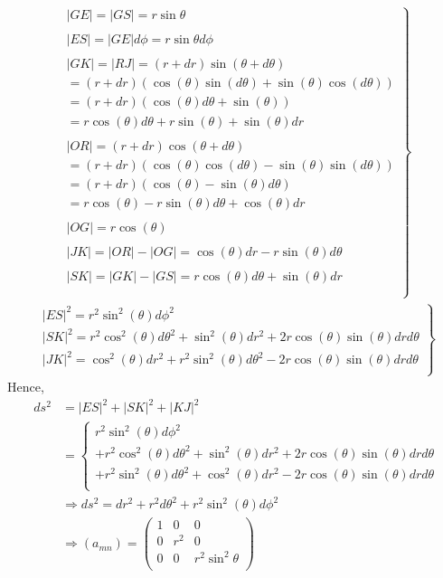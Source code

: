 \begin{align}
\left.
\begin{array}{c}
\ |GE| = |GS| = r\sin\theta\\\\
\ |ES| = |GE|d\phi = r\sin\theta d\phi\\\\
\ |GK| = |RJ| = (r+dr)\sin(\theta+d\theta) \\
\ =(r+dr)(\cos(\theta)\sin(d\theta)+\sin(\theta)\cos(d\theta) )\\
\ = (r+dr)(\cos(\theta)d\theta+\sin(\theta))\\
\ = r\cos(\theta)d\theta+r\sin(\theta)+\sin(\theta)dr\\\\
\ |OR| =  (r+dr)\cos(\theta+d\theta)\\
\ = (r+dr)(\cos(\theta)\cos(d\theta)-\sin(\theta)\sin(d\theta))\\
\ = (r+dr)(\cos(\theta)-\sin(\theta)d\theta)\\
\ = r\cos(\theta)-r\sin(\theta)d\theta + \cos(\theta)dr\\\\
\ |OG| = r\cos(\theta)\\\\
\ |JK| = |OR|-|OG| = \cos(\theta)dr-r\sin(\theta)d\theta\\\\
\ |SK| = |GK|-|GS| = r\cos(\theta)d\theta+\sin(\theta)dr\\\\
\end{array}
\right\}
\end{align}
\begin{align}
\left.
\begin{array}{c}
\ |ES|^2 = r^2\sin^2(\theta)d\phi^2\\
\ |SK|^2 = r^2\cos^2(\theta)d\theta^2+\sin^2(\theta)dr^2 +2r\cos(\theta)\sin(\theta)drd\theta \\
\ |JK|^2 = \cos^2(\theta)dr^2+r^2\sin^2(\theta)d\theta^2 -2r\cos(\theta)\sin(\theta)drd\theta\\
\end{array}
\right\}
\end{align}
Hence,
\begin{align}
\ ds^2 &= |ES|^2+|SK|^2+|KJ|^2\\
&= \left\{ \begin{array}{c} r^2\sin^2(\theta)d\phi^2 \\ +r^2\cos^2(\theta)d\theta^2+\sin^2(\theta)dr^2 +2r\cos(\theta)\sin(\theta)drd\theta\\+r^2\sin^2(\theta)d\theta^2+\cos^2(\theta)dr^2 -2r\cos(\theta)\sin(\theta)drd\theta\\
\end{array}
\right.\\
\ &\Rightarrow ds^2= dr^2 + r^2d\theta^2 + r^2\sin^2(\theta)d\phi^2\\
\ & \Rightarrow (a_{mn}) = \begin{pmatrix}
 1& 0 & 0\\
0 & r^2 & 0 \\
0 & 0 & r^2\sin^2\theta \\
\end{pmatrix}
\end{align}
